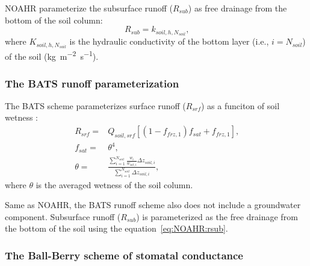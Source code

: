 \documentclass[essd]{copernicus}
\begin{document}
NOAHR parameterize the subsurface runoff (\(R_{sub}\)) as free drainage from the
bottom of the soil column:
\begin{equation}
  R_{sub} = k_{soil,h,N_{soil}} \label{eq:NOAHR:rsub} \text{,}
\end{equation}
where \(K_{soil,h,N_{soil}}\) is the hydraulic conductivity of the bottom layer
(i.e., \(i=N_{soil}\)) of the soil (\si{kg~m^{-2}~s^{-1}}).


\subsubsection{The BATS runoff parameterization}

The BATS scheme parameterizes surface runoff (\(R_{srf}\)) as a funciton of soil
wetness \citep{yang1996GPC}:
\begin{align}
  R_{srf} = & Q_{soil,srf} \left[ (1 - f_{frz,1}) f_{sat} + f_{frz,1} \right]
  \text{,} \\
  f_{sat} = & \theta^4 \text{,} \\
  \theta =  & \frac{\sum_{i=1}^{N_{soil}}\frac{w_i}{w_{sat,i}}\Delta
  z_{soil,i}}{\sum_{i=1}^{N_{soil}}\Delta z_{soil,i}} \text{,}
\end{align}
where \(\theta\) is the averaged wetness of the soil column.

Same as NOAHR, the BATS runoff scheme also does not include a groundwater
component. Subsurface runoff (\(R_{sub}\)) is parameterized as the free drainage
from the bottom of the soil using the equation~\eqref{eq:NOAHR:rsub}.


\subsubsection{The Ball-Berry scheme of stomatal conductance}
\end{document}
